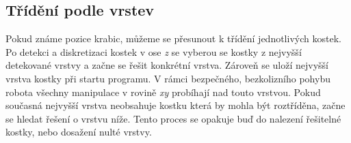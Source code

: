 \documentclass[journal,twoside,web]{ieeecolor}
\begin{document}
        \subsection{Třídění podle vrstev}
            Pokud známe pozice krabic, můžeme se přesunout k třídění jednotlivých kostek. Po detekci a diskretizaci kostek v ose \textit{z} se vyberou se kostky
            z nejvyšší detekované vrstvy a začne se řešit konkrétní vrstva. Zároveň se uloží nejvyšší vrstva kostky při startu programu. V rámci bezpečného, bezkolizního
            pohybu robota všechny manipulace v rovině \textit{xy} probíhají nad touto vrstvou. Pokud současná nejvyšší vrstva neobsahuje kostku která by mohla být roztříděna,
            začne se hledat řešení o vrstvu níže. Tento proces se opakuje buď do nalezení řešitelné kostky, nebo dosažení nulté vrstvy.
\end{document}
